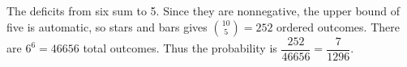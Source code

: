 The deficits from six sum to 5. Since they are nonnegative, the upper bound of five is automatic, so stars and bars gives $\binom{10}{5}=252$ ordered outcomes. There are $6^6=46656$ total outcomes. Thus the probability is $\dfrac{252}{46656}=\boxed{\dfrac{7}{1296}}$.
